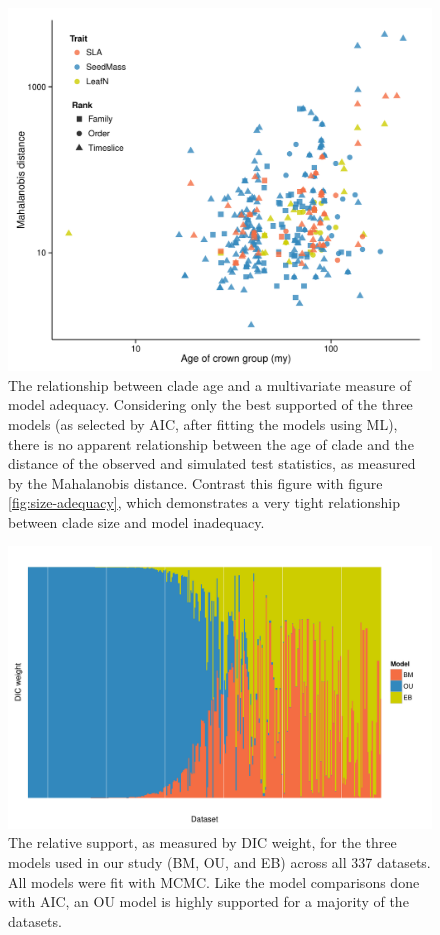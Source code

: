 \documentclass[a4paper,11pt]{article}
\begin{document}
\begin{figure}[p]
  \centering
  \includegraphics[scale=0.8]{figs/ad-age-ml}
  \caption{The relationship between clade age and a multivariate measure of model adequacy. Considering only the best supported of the three models (as selected by AIC, after fitting the models using ML), there is no  apparent relationship between the age of clade and the distance of the observed and simulated test statistics, as measured by the Mahalanobis distance. Contrast this figure with figure \ref{fig:size-adequacy}, which demonstrates a very tight relationship between clade size and model inadequacy.}
  \label{fig:supp-age-ml}
\end{figure}

\begin{figure}[p]
  \centering
  \includegraphics[angle=90, origin=c, scale=0.8]{figs/dic-support}
  \caption{The relative support, as measured by DIC weight, for the three models used in our study (BM, OU, and EB) across all 337 datasets. All models were fit with MCMC. Like the model comparisons done with AIC, an OU model is highly supported for a majority of the datasets.}
  \label{fig:supp-dic-support}
\end{figure}
\end{document}
